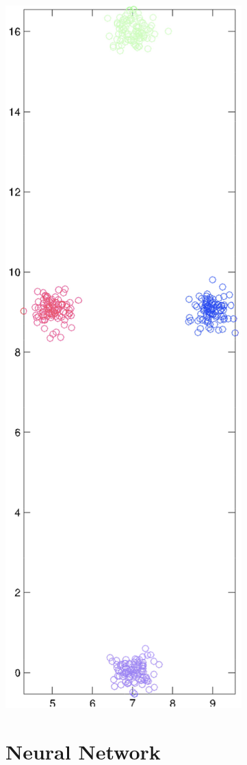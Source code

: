 \documentclass{article}
\begin{document}
\begin{center}
    \includegraphics[scale=0.5]{images/Q2P4F.png}
\end{center}

\section{Neural Network}
\end{document}
